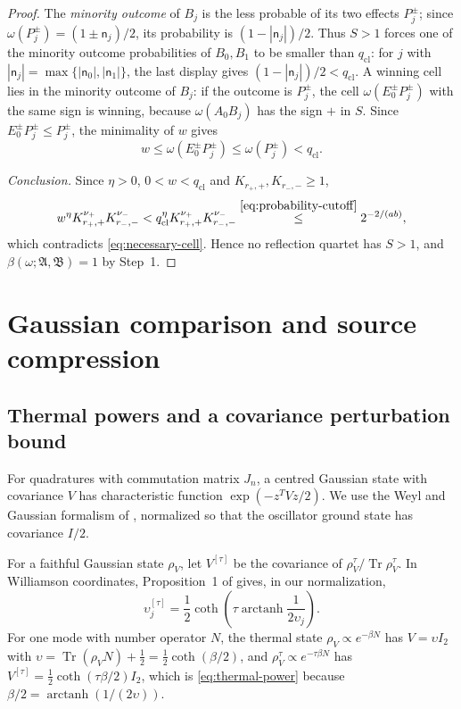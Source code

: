 \documentclass[11pt]{amsart}
\numberwithin{equation}{section}
\theoremstyle{definition}
\newcommand{\A}{\mathfrak A}
\newcommand{\B}{\mathfrak B}
\newcommand{\Tr}{\operatorname{Tr}}
\newcommand{\arctanh}{\operatorname{arctanh}}
\begin{document}
\begin{proof}
The \emph{minority outcome} of \(B_j\) is the less probable of its two
effects \(P_j^\pm\); since \(\omega(P_j^\pm)=(1\pm\mathsf n_j)/2\), its
probability is \((1-|\mathsf n_j|)/2\). Thus \(S>1\) forces one of the
minority outcome probabilities of \(B_0,B_1\) to be smaller than \(q_{\mathrm{cl}}\):
for \(j\) with \(|\mathsf n_j|=\max\{|\mathsf n_0|,|\mathsf n_1|\}\), the
last display gives \((1-|\mathsf n_j|)/2<q_{\mathrm{cl}}\). A winning
cell lies in the minority outcome of \(B_j\): if the outcome
is \(P_j^\pm\), the cell \(\omega(E_0^\pm P_j^\pm)\) with the same sign is
winning, because \(\omega(A_0B_j)\) has the sign \(+\) in \(S\). Since
\(E_0^\pm P_j^\pm\le P_j^\pm\), the minimality of \(w\) gives
\[
 w\le\omega(E_0^\pm P_j^\pm)\le\omega(P_j^\pm)<q_{\mathrm{cl}}.
\]

\smallskip
\emph{Conclusion.} Since \(\eta>0\), \(0<w<q_{\mathrm{cl}}\) and
\(K_{r_+,+},K_{r_-,-}\ge1\),
\[
 w^\eta K_{r_+,+}^{\nu_+}K_{r_-,-}^{\nu_-}
 <q_{\mathrm{cl}}^\eta K_{r_+,+}^{\nu_+}K_{r_-,-}^{\nu_-}
 \overset{\eqref{eq:probability-cutoff}}{\le}2^{-2/(ab)},
\]
which contradicts \eqref{eq:necessary-cell}. Hence no reflection quartet
has \(S>1\), and \(\beta(\omega;\A,\B)=1\) by Step~1.
\end{proof}

\section{Gaussian comparison and source compression}
\label{sec:gaussian}

\subsection{Thermal powers and a covariance perturbation bound}

For quadratures with commutation matrix \(J_n\), a centred Gaussian
state with covariance \(V\) has characteristic function
\(\exp(-z^TVz/2)\). We use the Weyl and Gaussian formalism of
\cite{SLW18}, normalized so that the oscillator ground state has covariance \(I/2\).

For a faithful Gaussian state \(\rho_V\), let \(V^{[\tau]}\) be the
covariance of \(\rho_V^\tau/{\Tr\rho_V^\tau}\). In Williamson coordinates,
Proposition~1 of \cite{SLW18} gives, in our normalization,
\begin{equation}
 \upsilon_j^{[\tau]}
 =\frac12\coth\!\left(
      \tau\arctanh\frac1{2\upsilon_j}\right).
 \label{eq:thermal-power}
\end{equation}
For one mode with number operator \(N\), the thermal state
\(\rho_V\propto e^{-\beta N}\) has \(V=\upsilon I_2\) with
\(\upsilon=\Tr(\rho_VN)+\frac12=\frac12\coth(\beta/2)\), and
\(\rho_V^\tau\propto e^{-\tau\beta N}\) has
\(V^{[\tau]}=\frac12\coth(\tau\beta/2)I_2\), which is
\eqref{eq:thermal-power} because \(\beta/2=\arctanh(1/(2\upsilon))\).
\end{document}
